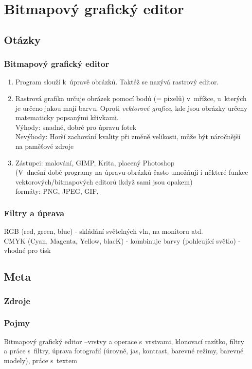 \documentclass[12pt]{article}
\begin{document}
\section{Bitmapový grafický editor}
\subsection{Otázky}
\subsubsection{Bitmapový grafický editor}
\begin{enumerate}
\item Program slouží k~úpravě obrázků. Taktéž se nazývá rastrový editor.
\item Rastrová grafika určuje obrázek pomocí bodů (= pixelů) v~mřížce, u~kterých je určeno jakou mají barvu. Oproti \emph{vektorové grafice}, kde jsou obrázky určeny matematicky  popsanými křivkami.\\
Výhody: snadné, dobré pro úpravu fotek\\
Nevýhody: Horší zachování kvality při změně velikosti, může být náročnější na paměťové zdroje
\item Zástupci: malování, GIMP, Krita, placený Photoshop\\
(V~dnešní době programy na úpravu obrázků často umožňují i některé funkce vektorových/bitmapových editorů ikdyž sami jsou opakem)\\
formáty: PNG, JPEG, GIF,
\end{enumerate}
\subsubsection{Filtry a úprava}
RGB (red, green, blue) - skládání světelných vln, na monitoru atd.\\
CMYK (Cyan, Magenta, Yellow, blacK) - kombinuje barvy (pohlcující světlo) - vhodné pro tisk		
\subsection{Meta}
\subsubsection{Zdroje}
\subsubsection{Pojmy}
Bitmapový grafický editor –vrstvy a operace s~vrstvami, klonovací razítko, filtry a práce s~filtry, úprava fotografií (úrovně, jas, kontrast, barevné režimy, barevné modely), práce s~textem
\end{document}
